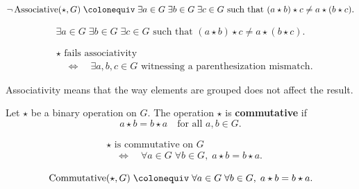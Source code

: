 \begin{remark*}
\[
\neg \operatorname{Associative}(\star, G)
\;\colonequiv\;
\exists a \in G\;\exists b \in G\;\exists c \in G \text{ such that }
(a \star b) \star c \ne a \star (b \star c).
\]
\end{remark*}

\begin{remark*}
\[
\exists a \in G\;\exists b \in G\;\exists c \in G \text{ such that }
(a \star b) \star c \ne a \star (b \star c).
\]
\end{remark*}

\begin{remark*}
\[
\begin{aligned}
&\star \text{ fails associativity} \\
&\quad\Longleftrightarrow\quad
\exists a,b,c \in G \text{ witnessing a parenthesization mismatch.}
\end{aligned}
\]
\end{remark*}

\begin{remark*}[Interpretation]
Associativity means that the way elements are grouped does not affect the result.
\end{remark*}


\begin{tcolorbox}[title={Definition --- Commutativity}]
\begin{definition}[Commutativity]
\label{def:commutativity}
Let $\star$ be a binary operation on $G$. The operation $\star$ is
\textbf{commutative} if
\[
a \star b = b \star a
\quad \text{for all } a, b \in G.
\]
\end{definition}
\end{tcolorbox}

\begin{remark*}
\[
\begin{aligned}
&\star \text{ is commutative on } G \\
&\quad\Longleftrightarrow\quad
\forall a \in G\;\forall b \in G,\; a \star b = b \star a.
\end{aligned}
\]
\end{remark*}

\begin{remark*}
\[
\operatorname{Commutative}(\star, G)
\;\colonequiv\;
\forall a \in G\;\forall b \in G,\; a \star b = b \star a.
\]
\end{remark*}

